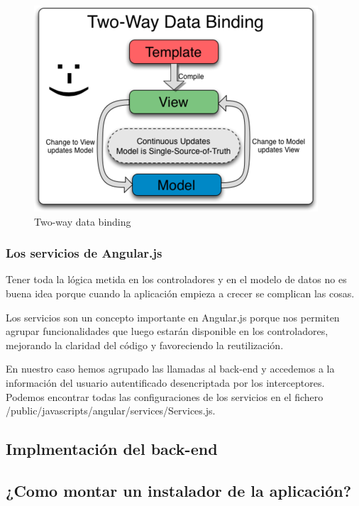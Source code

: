 \begin{figure}[H]
	\centering\includegraphics[scale=0.5]{imagenes/twoway.png}
	\caption{Two-way data binding}
	\label{twoWayDataBinding}
\end{figure}

\subsubsection{Los servicios de Angular.js}

Tener toda la lógica metida en los controladores y en el modelo de datos no es buena idea porque cuando la aplicación empieza a crecer se complican las cosas.

Los servicios son un concepto importante en Angular.js porque nos permiten agrupar funcionalidades que luego estarán disponible en los controladores, mejorando la claridad del código y favoreciendo la reutilización.

En nuestro caso hemos agrupado las llamadas al back-end y accedemos a la información del usuario autentificado desencriptada por los interceptores. Podemos encontrar todas las configuraciones de los servicios en el fichero /public/javascripts/angular/services/Services.js.

\subsection{Implmentación del back-end}



\subsection{¿Como montar un instalador de la aplicación?}


